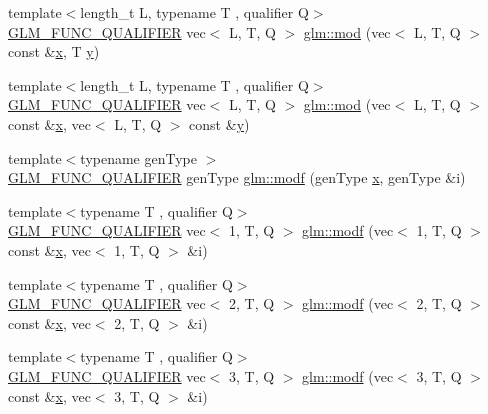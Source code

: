 \begin{DoxyCompactItemize}
\item 
{\footnotesize template$<$length\+\_\+t L, typename T , qualifier Q$>$ }\\\hyperlink{setup_8hpp_a33fdea6f91c5f834105f7415e2a64407}{G\+L\+M\+\_\+\+F\+U\+N\+C\+\_\+\+Q\+U\+A\+L\+I\+F\+I\+ER} vec$<$ L, T, Q $>$ \hyperlink{group__core__func__common_gafddfd397d57f94556b9560594172a439}{glm\+::mod} (vec$<$ L, T, Q $>$ const \&\hyperlink{_s_d_l__opengl_8h_ad0e63d0edcdbd3d79554076bf309fd47}{x}, T \hyperlink{_s_d_l__opengl_8h_a1675d9d7bb68e1657ff028643b4037e3}{y})
\item 
{\footnotesize template$<$length\+\_\+t L, typename T , qualifier Q$>$ }\\\hyperlink{setup_8hpp_a33fdea6f91c5f834105f7415e2a64407}{G\+L\+M\+\_\+\+F\+U\+N\+C\+\_\+\+Q\+U\+A\+L\+I\+F\+I\+ER} vec$<$ L, T, Q $>$ \hyperlink{group__core__func__common_ga9b197a452cd52db3c5c18bac72bd7798}{glm\+::mod} (vec$<$ L, T, Q $>$ const \&\hyperlink{_s_d_l__opengl_8h_ad0e63d0edcdbd3d79554076bf309fd47}{x}, vec$<$ L, T, Q $>$ const \&\hyperlink{_s_d_l__opengl_8h_a1675d9d7bb68e1657ff028643b4037e3}{y})
\item 
{\footnotesize template$<$typename gen\+Type $>$ }\\\hyperlink{setup_8hpp_a33fdea6f91c5f834105f7415e2a64407}{G\+L\+M\+\_\+\+F\+U\+N\+C\+\_\+\+Q\+U\+A\+L\+I\+F\+I\+ER} gen\+Type \hyperlink{group__core__func__common_ga85e33f139b8db1b39b590a5713b9e679}{glm\+::modf} (gen\+Type \hyperlink{_s_d_l__opengl_8h_ad0e63d0edcdbd3d79554076bf309fd47}{x}, gen\+Type \&i)
\item 
{\footnotesize template$<$typename T , qualifier Q$>$ }\\\hyperlink{setup_8hpp_a33fdea6f91c5f834105f7415e2a64407}{G\+L\+M\+\_\+\+F\+U\+N\+C\+\_\+\+Q\+U\+A\+L\+I\+F\+I\+ER} vec$<$ 1, T, Q $>$ \hyperlink{namespaceglm_ae1f87270f9792f92fd1bbc769564e8e3}{glm\+::modf} (vec$<$ 1, T, Q $>$ const \&\hyperlink{_s_d_l__opengl_8h_ad0e63d0edcdbd3d79554076bf309fd47}{x}, vec$<$ 1, T, Q $>$ \&i)
\item 
{\footnotesize template$<$typename T , qualifier Q$>$ }\\\hyperlink{setup_8hpp_a33fdea6f91c5f834105f7415e2a64407}{G\+L\+M\+\_\+\+F\+U\+N\+C\+\_\+\+Q\+U\+A\+L\+I\+F\+I\+ER} vec$<$ 2, T, Q $>$ \hyperlink{namespaceglm_a0c0ecf61b9a8f9f4d6f901b4e6542dca}{glm\+::modf} (vec$<$ 2, T, Q $>$ const \&\hyperlink{_s_d_l__opengl_8h_ad0e63d0edcdbd3d79554076bf309fd47}{x}, vec$<$ 2, T, Q $>$ \&i)
\item 
{\footnotesize template$<$typename T , qualifier Q$>$ }\\\hyperlink{setup_8hpp_a33fdea6f91c5f834105f7415e2a64407}{G\+L\+M\+\_\+\+F\+U\+N\+C\+\_\+\+Q\+U\+A\+L\+I\+F\+I\+ER} vec$<$ 3, T, Q $>$ \hyperlink{namespaceglm_a80404a2674e2aa9d6f3966e56bcdfbbf}{glm\+::modf} (vec$<$ 3, T, Q $>$ const \&\hyperlink{_s_d_l__opengl_8h_ad0e63d0edcdbd3d79554076bf309fd47}{x}, vec$<$ 3, T, Q $>$ \&i)

\end{DoxyCompactItemize}
